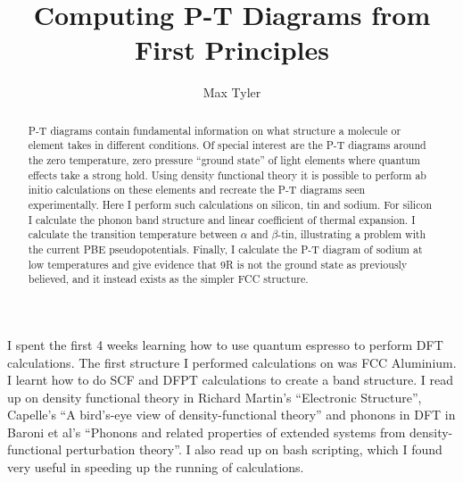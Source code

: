 \documentclass[12pt]{article}
\begin{document}
\title{Computing P-T Diagrams from First Principles} %
\author{Max Tyler} %

\begin{abstract}
	P-T diagrams contain fundamental information on what structure a molecule or element takes in different conditions. Of special interest are the P-T diagrams around the zero temperature, zero pressure ``ground state'' of light elements where quantum effects take a strong hold. Using density functional theory it is possible to perform ab initio calculations on these elements and recreate the P-T diagrams seen experimentally. Here I perform such calculations on silicon, tin and sodium. For silicon I calculate the phonon band structure and linear coefficient of thermal expansion. I calculate the transition temperature between $\alpha$ and $\beta$-tin, illustrating a problem with the current PBE pseudopotentials. Finally, I calculate the P-T diagram of sodium at low temperatures and give evidence that 9R is not the ground state as previously believed, and it instead exists as the simpler FCC structure.
\end{abstract}

\maketitle

\personalstatement

I spent the first 4 weeks learning how to use quantum espresso to perform DFT calculations. The first structure I performed calculations on was FCC Aluminium. I learnt how to do SCF and DFPT calculations to create a band structure. 
I read up on density functional theory in Richard Martin's ``Electronic Structure'', Capelle's ``A bird's-eye view of density-functional theory'' and phonons in DFT in Baroni et al's ``Phonons and related properties of extended systems from density-functional perturbation theory''. 
I also read up on bash scripting, which I found very useful in speeding up the running of calculations.
\end{document}
